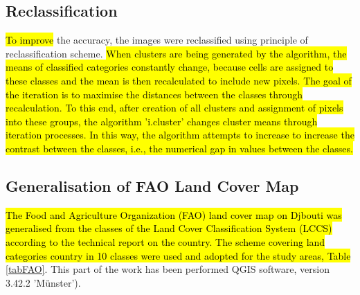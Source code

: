 \documentclass[jimaging,article,submit,pdftex,moreauthors]{Definitions/mdpi}
\begin{document}
\subsection{Reclassification}

\hl{To improve} the accuracy, the images were reclassified using principle of reclassification scheme. \hl{When clusters are being generated by the algorithm, the means of classified categories constantly change, because cells are assigned to these classes and the mean is then recalculated to include new pixels. The goal of the iteration is to maximise the distances between the classes through recalculation. To this end, after creation of all clusters and assignment of pixels into these groups, the algorithm 'i.cluster' changes cluster means through iteration processes. In this way, the algorithm attempts to increase to increase the contrast between the classes, i.e., the numerical gap in values between the classes.}

\subsection{{Generalisation of FAO Land Cover Map}}

\hl{The Food and Agriculture Organization (FAO) land cover map on Djbouti was generalised from the classes of the Land Cover Classification System (LCCS) according to the technical report on the country. The scheme covering land categories country in 10 classes were used and adopted for the study areas, Table} \ref{tabFAO}. This part of the work has been performed QGIS software, version 3.42.2 'M\"unster'). 
\end{document}
